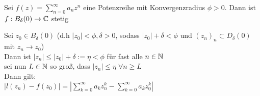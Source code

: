 \documentclass[../ana1u.tex]{subfiles}
\begin{document}
\begin{satz}
	Sei \(f(z) = \sum_{n=0}^{\infty} a_n z^n \) eine Potenzreihe mit Konvergenzradius \(\phi > 0\). Dann ist \(f: B_\delta(0) \rightarrow \mathbb{C} \) stetig\\
\end{satz}
\begin{bew}
	Sei \(z_0 \in B_\delta(0)\) (d.h \(|z_0| < \phi, \delta > 0\), sodass \(|z_0| + \delta < \phi\) und \((z_n)_n \subset D_\delta(0)\) mit \(z_n \rightarrow z_0\))\\
	Dann ist \(|z_n| \leq |z_0| + \delta := \eta < \phi\) für fast alle \(n \in \mathbb{N}\)\\
	sei nun \(L \in \mathbb{N} \) so groß, dass \(|z_n| \leq \eta \; \forall n \geq L \)\\
	Dann gilt:\\
	\(|l(z_n) - f(z_0)| = |\sum_{k=0}^{\infty} a_k z_n^k - \sum_{k=0}^{\infty} a_k z_0^k|\)
\end{bew}
\end{document}
